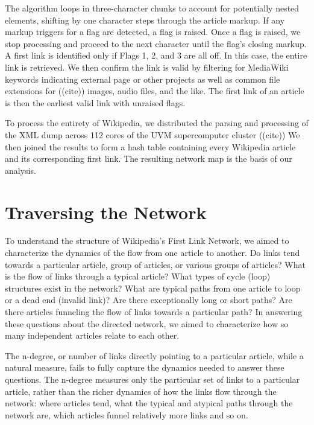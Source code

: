 \documentclass[twoside]{article}
\begin{document}
The algorithm loops in three-character chunks to account for potentially nested elements, 
shifting by one character steps through the article markup.
If any markup triggers for a flag are detected, a flag is raised. 
Once a flag is raised, we stop processing and proceed to the next character
until the flag's closing markup.
A first link is identified only if Flags 1, 2, and 3 are all off.
In this case, the entire link is retrieved. 
We then confirm the link is valid by filtering for MediaWiki keywords indicating external page or other projects
as well as common file extensions for 
((cite))
images, audio files, and the like.
The first link of an article is then the earliest valid link with unraised flags.

To process the entirety of Wikipedia, we distributed the parsing and processing of the XML dump
across 112 cores of the UVM supercomputer cluster
((cite))
We then joined the results to form a hash table containing every Wikipedia article and its corresponding
first link. The resulting network map is the basis of our analysis.


\section{Traversing the Network}

To understand the structure of Wikipedia's First Link Network, we
aimed to characterize the dynamics of the flow from one article to another. 
Do links tend towards a particular article, group of articles, or various groups of articles? 
What is the flow of links through a typical article?
What types of cycle (loop) structures exist in the network?
What are typical paths from one article to loop or a dead end (invalid link)? 
Are there exceptionally long or short paths? 
Are there articles funneling the flow of links towards a particular path?
In answering these questions about the directed network, we aimed to characterize 
how so many independent articles relate to each other.

The n-degree, or number of links directly pointing to a particular article,
while a natural measure, fails to fully capture the dynamics needed to answer these questions.
The n-degree measures only the particular set of links to a particular article, 
rather than the richer dynamics of how the links flow through the network: 
where articles tend, what the typical and atypical 
paths through the network are, which articles funnel relatively more links and so on. 
\end{document}
